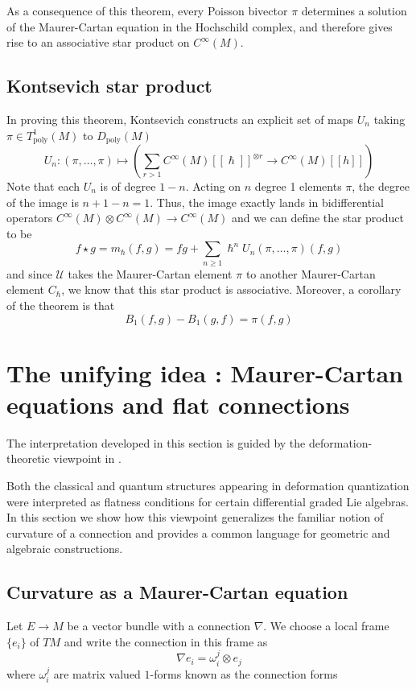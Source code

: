 \documentclass[
  12pt,
  a4paper, oneside
]{report}
\renewcommand{\hbar}{\hslash}
\theoremstyle{bolddef}
\theoremstyle{remark}
\numberwithin{equation}{chapter}
\begin{document}
As a consequence of this theorem, every Poisson bivector $\pi$ determines a solution of the
Maurer-Cartan equation in the Hochschild complex, and therefore gives rise to
an associative star product on $C^\infty(M)$. 
\subsection*{Kontsevich star product}
In proving this theorem, Kontsevich constructs an explicit set of maps $U_{n}$ taking $\pi \in T^{1}_{\mathrm{poly}}(M)$ to $D_{\mathrm{poly}}(M)$ 
$$
U_{n} : (\pi, \ldots ,\pi) \longmapsto \left( \sum_{r>1} C^\infty(M)[[\hbar]]^{\otimes r} \rightarrow C^\infty(M)[[h]] \right)$$
Note that each $U_{n}$ is of degree $1-n$. Acting on $n$ degree 1 elements $\pi$, the degree of the image is $n + 1 - n = 1$. Thus, the image exactly lands in bidifferential operators $C^\infty(M) \otimes C^\infty(M) \rightarrow C^\infty(M)$ and we can define the star product to be 
\begin{equation}
    f \star g = m_{\hbar}(f,g) = fg + \sum_{n \ge 1} \hbar^{n} U_{n}(\pi, \ldots, \pi)(f,g)
\end{equation}
and since $\mathcal{U}$ takes the Maurer-Cartan element $\pi$ to another Maurer-Cartan element $C_{\hbar}$, we know that this star product is associative. Moreover, a corollary of the theorem is that\cite{GraciaSaz2003,Kontsevich2003} 
$$
B_{1}(f,g) - B_{1}(g,f)  = \pi(f,g)
$$

\section{The unifying idea : Maurer-Cartan equations and flat connections}    
The interpretation developed in this section is guided by the deformation-theoretic viewpoint in \cite{GraciaSaz2003,Kontsevich2003}.

Both the classical and quantum structures appearing in deformation quantization were interpreted as flatness conditions for certain differential graded Lie algebras. In this section we show how this viewpoint generalizes the familiar notion of curvature of a connection and provides a common language for geometric
and algebraic constructions.

\subsection*{Curvature as a Maurer-Cartan equation}

Let $E \to M$ be a vector bundle with a connection $\nabla$.
We choose a local frame $\{e_i\}$ of $TM$ and write the connection in this frame as
\[
\nabla e_i = \omega_i^{j} \otimes e_j
\]
where $\omega_i^{j}$ are matrix valued $1$-forms known as the connection forms
\end{document}

